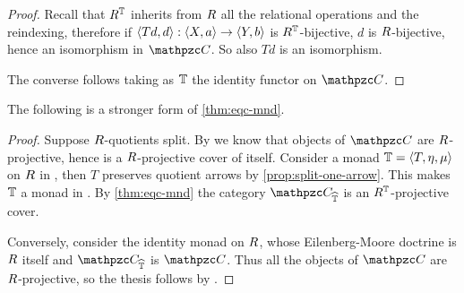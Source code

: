 \begin{proof} Recall that $R^{\mathbb{T}}$ inherits from $R$ all the relational operations and the reindexing, therefore if $\fun{\ple{Td,d}}{\ple{X,a}}{\ple{Y,b}}$ is $R^{\mathbb{T}}$-bijective, $d$ is $R$-bijective, hence an isomorphism in $\CC$. So also $Td$ is an isomorphism. 


The converse follows taking as $\mathbb{T}$ the identity functor on $\CC$. 
\end{proof}

The following is a stronger form of \cref{thm:eqc-mnd}. 

\begin{proof}
Suppose $R$-quotients split. By  we know that objects of $\CC$ are $R$-projective, hence \CC is a $R$-projective cover of itself. 
Consider a monad $\mathbb{T} = {\langle T,\eta,\mu \rangle }$ on $R$ in \RDtn, then 
 $T$ preserves quotient arrows by \cref{prop:split-one-arrow}. This makes $\mathbb{T}$ a monad in \EQRDtn. By \cref{thm:eqc-mnd} the category $\CC_{\fn\mnd}$ is an $R^{\mathbb{T}}$-projective cover. 

Conversely, consider the identity monad on $R$, whose Eilenberg-Moore doctrine is $R$ itself and $\CC_{\fn\mnd}$ is $\CC$. Thus all the objects of $\CC$ are $R$-projective, so the thesis follows by . 
% 
\end{proof}





